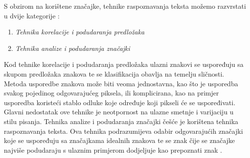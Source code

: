 S obzirom na korištene značajke, tehnike raspoznavanja teksta možemo razvrstati u dvije kategorije \citep{govindan1989}:
\begin{enumerate}
    \item \emph{Tehnika korelacije i podudaranja predložaka}
    \item \emph{Tehnika analize i podudaranja značajki}
\end{enumerate}
Kod tehnike korelacije i podudaranja predložaka ulazni znakovi se uspoređuju sa skupom predložaka znakova te se
klasifikacija obavlja na temelju sličnosti. Metoda usporedbe znakova može biti veoma jednostavna, kao što je usporedba
svakog pojedinog odgovarajućeg piksela, ili komplicirana, kao na primjer usporedba koristeći stablo odluke koje određuje
koji pikseli će se uspoređivati. Glavni nedostatak ove tehnike je neotpornost na ulazne smetnje i varijaciju u stilu
pisanja. Tehnika analize i podudaranja značajki češće je korištena tehnika raspoznavanja teksta. Ova tehnika
podrazumijeva odabir odgovarajućih značajki koje se uspoređuju sa značajkama idealnih znakova te se znak čije se
značajke najviše podudaraju s ulaznim primjerom dodjeljuje kao prepoznati znak \citep{govindan1989}.


